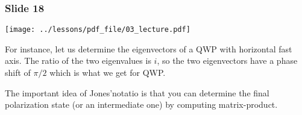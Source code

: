 \documentclass[../main/main.tex]{subfiles}
\begin{document}
\subsubsection*{Slide 18}

\begin{minipage}[]{0.5\linewidth}
\centering
\texttt{[image: ../lessons/pdf\_file/03\_lecture.pdf]}
\end{minipage}
\hspace{0.3cm}\vspace{0.3cm}
\begin{minipage}[c]{0.47\linewidth}

For instance, let us determine the eigenvectors of a QWP with horizontal fast axis.
The ratio of the two eigenvalues is \( i \), so the two eigenvectors have a phase shift of \( \pi /2 \) which is what we get for QWP.

The important idea of Jones'notatio is that you can determine the final polarization state (or an intermediate one) by computing matrix-product.


\end{minipage}
\end{document}
